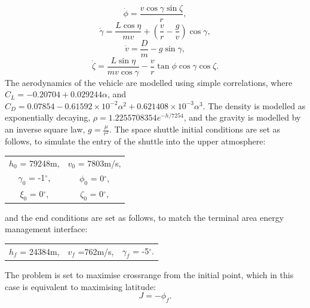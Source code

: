 \begin{equation}
\dot{\phi} = \frac{v\cos\gamma\sin\zeta}{r},
\end{equation}
\begin{equation}
\dot{\gamma} = \frac{L \cos\eta}{mv} + (\frac{v}{r}-\frac{g}{v})\cos\gamma,
\end{equation}
\begin{equation}
\dot{v} = \frac{D}{m}-g\sin\gamma,
\end{equation}
\begin{equation}
\dot{\zeta} = \frac{L  \sin\eta}{mv \cos \gamma}-\frac{v}{r}\tan\phi\cos\gamma\cos\zeta.
\end{equation}
The aerodynamics of the vehicle are modelled using simple correlations, where $C_L = −0.20704 + 0.029244\alpha$, and $C_D = 0.07854 -0.61592\times10^{-2}\alpha^2 + 0.621408\times10^{-3}\alpha^3$. The density is modelled as exponentially decaying, $\rho = 1.2255708354e^{-h/7254}$, and the gravity is modelled by an inverse square law, $g = \frac{\mu}{r^2}$.
The space shuttle initial conditions are set as follows\cite{Betts2009}, to simulate the entry of the shuttle into the upper atmosphere:
\begin{table}[H]
	\centering
\begin{tabular}{c c}
  $h_0$ =  79248m, & $v_0$ = 7803m/s, \\ 
  $\gamma_0$ =  -1$^\circ$, & $\phi_0$ =  0$^\circ$,\\ 
 $\xi_0$ =  0$^\circ$, & $\zeta_0$ =  0$^\circ$,\\ 
\end{tabular} 
\end{table}
\noindent
and the end conditions are set as follows\cite{Betts2009}, to match the terminal area energy management interface:
\begin{table}[H]
	\centering
	\begin{tabular}{ c c c}
		   $h_f$ =  24384m, &  $v_f$ =762m/s, & $\gamma_f$ =  -5$^\circ$.\\ 
	\end{tabular} 
\end{table}
\noindent
The problem is set to maximise crossrange from the initial point, which in this case is equivalent to maximising latitude:
\begin{equation}
J = -\phi_f.
\end{equation}

